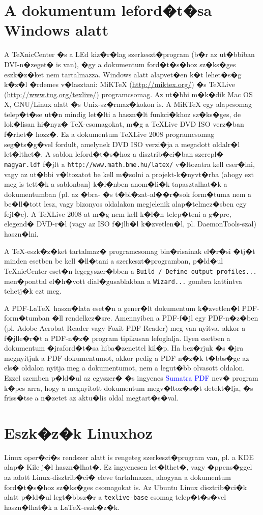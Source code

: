 \section{A dokumentum leford�t�sa Windows alatt}
A TeXnicCenter �s a LEd kiz�r�lag szerkeszt�program (b�r az ut�bbiban DVI-n�zeget� is van), �gy a dokumentum ford�t�s�hoz sz�ks�ges eszk�z�ket nem tartalmazza. Windows alatt alapvet�en k�t lehet�s�g k�z�l �rdemes v�lasztani: MiKTeX (\url{http://miktex.org/}) �s TeXLive (\url{http://www.tug.org/texlive/}) programcsomag. Az ut�bbi m�k�dik Mac OS X, GNU/Linux alatt �s Unix-sz�rmaz�kokon is. A MiKTeX egy alapcsomag telep�t�se ut�n mindig let�lti a haszn�lt funkci�khoz sz�ks�ges, de lok�lisan hi�nyz� \TeX-csomagokat, m�g a TeXLive DVD ISO verz�ban f�rhet� hozz�. Ez a dokumentum TeXLive 2008 programcsomag seg�ts�g�vel fordult, amelynek DVD ISO verzi�ja a megadott oldalr�l let�lthet�. A sablon leford�t�s�hoz a disztrib�ci�ban szerepl� \verb+magyar.ldf+ f�jlt a \verb+http://www.math.bme.hu/latex/+ v�ltozatra kell cser�lni, vagy az ut�bbi v�ltozatot be kell m�solni a projekt-k�nyvt�rba (ahogy ezt meg is tett�k a sablonban) k�l�nben anom�li�k tapasztalhat�k a dokumentumban (pl. az �bra- �s t�bl�zat-al��r�sok form�tuma nem a be�ll�tott lesz, vagy bizonyos oldalakon megjelenik alap�telmez�sben egy fejl�c). A TeXLive 2008-at m�g nem kell k�l�n telep�teni a g�pre, elegend� DVD-r�l (vagy az ISO f�jlb�l k�zvetlen�l, pl. DaemonTools-szal) haszn�lni. 

A \TeX-eszk�z�ket tartalmaz� programcsomag bin�risainak el�r�si �tj�t minden esetben be kell �ll�tani a szerkeszt�programban, p�ld�ul TeXnicCenter eset�n legegyszer�bben a \verb+Build / Define output profiles...+ men�ponttal el�h�vott dial�gusablakban a \verb+Wizard...+ gombra kattintva tehetj�k ezt meg.

A PDF-\LaTeX~haszn�lata eset�n a gener�lt dokumentum k�zvetlen�l PDF-form�tumban �ll rendelkez�sre. Amennyiben a PDF-f�jl egy PDF-n�z�ben (pl. Adobe Acrobat Reader vagy Foxit PDF Reader) meg van nyitva, akkor a f�jlle�r�t a PDF-n�z� program tipikusan lefoglalja. Ilyen esetben a dokumentum �jraford�t�sa hiba�zenettel kil�p. Ha bez�rjuk �s �jra megnyitjuk a PDF dokumentumot, akkor pedig a PDF-n�z�k t�bbs�ge az els� oldalon nyitja meg a dokumentumot, nem a legut�bb olvasott oldalon. Ezzel szemben p�ld�ul az egyszer� �s ingyenes \textcolor{blue}{Sumatra PDF} nev� program k�pes arra, hogy a megnyitott dokumentum megv�ltoz�s�t detekt�lja, �s friss�tse a n�zetet az aktu�lis oldal megtart�s�val.

\section{Eszk�z�k Linuxhoz}
Linux oper�ci�s rendszer alatt is rengeteg szerkeszt�program van, pl. a KDE alap� Kile j�l haszn�lhat�. Ez ingyenesen let�lthet�, vagy �ppens�ggel az adott Linux-disztrib�ci� eleve tartalmazza, ahogyan a dokumentum ford�t�s�hoz sz�ks�ges csomagokat is. Az Ubuntu Linux disztrib�ci�k alatt p�ld�ul legt�bbsz�r a \verb+texlive-base+ csomag telep�t�s�vel haszn�lhat�k a \LaTeX-eszk�z�k.
